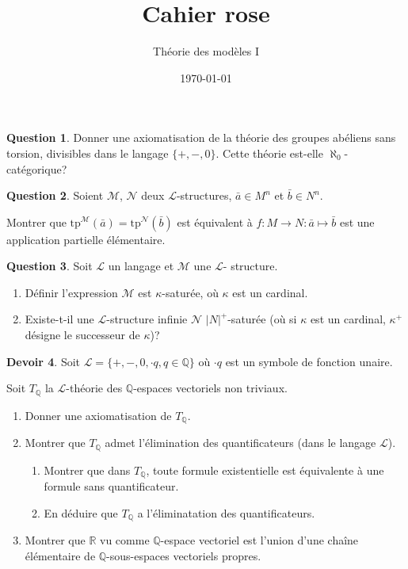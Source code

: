 \documentclass[a4paper, 12pt]{article}
\title{Cahier rose}
\author{Théorie des modèles I}
\date{\today}
\theoremstyle{definition} \newtheorem{quest}{Question}
\theoremstyle{definition} \newtheorem{dev}[quest]{Devoir}
\newcommand{\tp}[2]{\mathrm{tp}^{\mathscr{#1}}\left(#2\right)}
\begin{document}
\maketitle

\begin{quest}
  Donner une axiomatisation de la théorie des groupes abéliens
  sans torsion, divisibles dans le langage $\{+, -, 0\}$. Cette
  théorie est-elle $\aleph_0$-catégorique?
\end{quest}

\begin{quest}
  Soient $\mathscr M$, $\mathscr N$ deux $\mathscr L$-structures,
  $\bar{a}\in M^n$ et $\bar{b}\in N^n$.

  Montrer que $\tp{M}{\bar{a}} = \tp{N}{\bar{b}}$ est équivalent
  à $f: M\to N: \bar{a}\mapsto \bar{b}$ est une application
  partielle élémentaire.
\end{quest}

\begin{quest}
  Soit $\mathscr{L}$ un langage et $\mathscr{M}$ une $\mathscr L$-%
  structure.
  \begin{enumerate}
  \item Définir l'expression \og $\mathscr M$ est $\kappa$-saturée\fg{},
    où $\kappa$ est un cardinal.
  \item Existe-t-il une $\mathscr L$-structure infinie $\mathscr N$
    $|N|^+$-saturée (où si $\kappa$ est un cardinal, $\kappa^+$ désigne
    le successeur de $\kappa$)?

  \end{enumerate}
\end{quest}

\begin{dev}
  Soit $\mathscr L = \{ +, -, 0, \cdot q, q\in\mathbb Q\}$ où
  $\cdot q$ est un symbole de fonction unaire.

  Soit $T_{\mathbb Q}$ la $\mathscr L$-théorie des $\mathbb Q$-espaces
  vectoriels non triviaux.
  \begin{enumerate}
  \item Donner une axiomatisation de $T_{\mathbb Q}$.
  \item Montrer que $T_{\mathbb Q}$ admet l'élimination
    des quantificateurs (dans le langage $\mathscr L$).
    \begin{enumerate}
    \item Montrer que dans $T_{\mathbb Q}$, toute formule
      existentielle est équivalente à une formule sans quantificateur.
    \item En déduire que $T_{\mathbb Q}$ a l'éliminatation
      des quantificateurs.
    \end{enumerate}
  \item Montrer que $\mathbb R$ vu comme $\mathbb Q$-espace
    vectoriel est l'union d'une chaîne élémentaire de
    $\mathbb Q$-sous-espaces vectoriels propres.
  \end{enumerate}
\end{dev}
\end{document}
